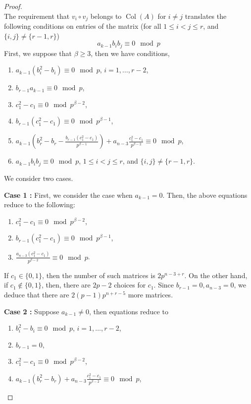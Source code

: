 \documentclass[10pt,a4paper]{amsart}
\newcommand{\op}[1]{\operatorname{#1}}
\begin{document}
\begin{proof}
\begin{equation}
\end{equation}
The requirement that $v_i\circ v_j$ belongs to $\op{Col}(A)$ for $i\neq j$ translates the following conditions on entries of the matrix (for all $1 \leq i < j \leq r$, and $\{i,j\} \neq \{r-1,r\}$)
\begin{equation*}
    a_{k-1}b_ib_j \equiv 0 \mod p
\end{equation*}
First, we suppose that $\beta \geq 3$, then we have conditions,
\begin{enumerate}
    \item $a_{k-1}(b_i^2-b_i) \equiv 0 \mod{p}$, $i=1,\dots,r-2$,
    \item $b_{r-1}a_{k-1} \equiv 0 \mod p$,
    \item $c_1^2-c_1 \equiv 0 \mod p^{\beta-2}$,
    \item $b_{r-1}(c_1^2-c_1) \equiv 0 \mod p^{\beta-1}$,
    \item $a_{k-1}\left(b_r^2-b_r-\frac{b_{r-1}(c_1^2-c_1)}{p^{\beta-1}}\right)+a_{n-3}\frac{c_1^2-c_1}{p^{\beta-2}} \equiv 0 \mod p$,
    \item $a_{k-1}b_ib_j \equiv 0 \mod p$, $1 \leq i < j \leq r$, and $\{i,j\} \neq \{r-1,r\}$.
\end{enumerate}
We consider two cases.
\par \textbf{Case 1 :} First, we consider the case when $a_{k-1} = 0$. Then, the above equations reduce to the following:
\begin{enumerate}
    \item $c_1^2-c_1 \equiv 0 \mod p^{\beta-2}$,
    \item $b_{r-1}(c_1^2-c_1) \equiv 0 \mod p^{\beta-1}$,
    \item $\frac{a_{n-3}(c_1^2-c_1)}{p^{\beta-2}} \equiv 0 \mod p$.
\end{enumerate}
If $c_1 \in \{0,1\}$, then the number of such matrices is $2p^{n-3+r}$. On the other hand, if $c_1 \notin \{0,1\}$, then, there are $2p-2$ choices for $c_1$. Since $b_{r-1} = 0, a_{n-3}=0$, we deduce that there are $2(p-1)p^{n+r-5}$ more matrices.
\par \textbf{Case 2 :} Suppose $a_{k-1} \neq 0$, then equations reduce to
\begin{enumerate}
\item $b_i^2-b_i \equiv 0 \mod p$, $i =1, \dots, r-2$,
\item $b_{r-1}=0$,
\item $c_1^2-c_1 \equiv 0 \mod p^{\beta-2}$,
\item $a_{k-1}\left(b_r^2-b_r\right)+a_{n-3}\frac{c_1^2-c_1}{p^{\beta-2}} \equiv 0 \mod p$,

\end{enumerate}
\end{proof}
\end{document}
